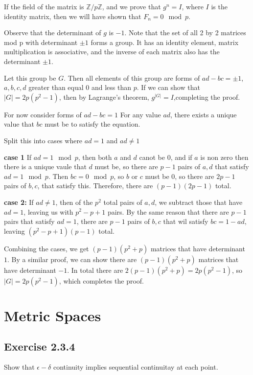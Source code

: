 \documentclass[11pt]{article}
\begin{document}
If the field of the matrix is \(\mathbb{Z} / p \mathbb{Z}\), and we prove
that \(g^n = I\), where \(I\) is the identity matrix, then we will have shown that
\(F_n = 0 \mod p\).


Observe that the determinant of \(g\)  is \(-1\). Note that the set of all 2 by 2 matrices
mod p
with determinant \(\pm 1\) forms a group. It has an identity element,
matrix multiplication is associative, and the inverse of each matrix
also has the determinant \(\pm 1\).

Let this group be \(G\).  Then all elements of this group are forms of \(ad - bc = \pm 1\),
\(a, b, c, d\) greater than equal \(0\) and  less than \(p\). If we can show that
\(|G| = 2p(p^2 - 1)\), then by Lagrange's theorem, \(g^{|G|} = I\),completing the proof.


For now consider forms of \(ad - bc = 1\)
For any value \(ad\), there exists a unique value that \(bc\) must be to
satisfy the equation.

Split this into cases where \(ad = 1\) and \(ad \ne 1\)

\textbf{case 1}
If \(ad = 1 \mod p\), then both \(a\) and \(d\) canot be \(0\), and if \(a\) is non zero
then there is a unique vaule that \(d\) must be, so there are \(p - 1\) pairs of \(a, d\)
that satisfy \(ad = 1 \mod p\).  Then \(bc = 0 \mod p\), so \(b\) or \(c\) must be \(0\), so
there are \(2p - 1\) pairs of \(b, c\), that satisfy this.  Therefore, there are
\((p - 1)(2p - 1)\) total.

\textbf{case 2:}
If \(ad \ne 1\), then of the \(p^2\) total pairs of \(a, d\), we subtract those that have
\(ad = 1\), leaving us with \(p^2 - p + 1\) pairs.  By the same reason that
there are \(p - 1\) pairs that satisfy \(ad = 1\), there are \(p -1\) pairs of \(b, c\)
that wil satisfy \(bc = 1 - ad\), leaving \((p^2 - p + 1)(p - 1)\) total.

Combining the cases, we get \((p - 1)(p^2 + p)\) matrices that have determinant \(1\).
By a similar proof, we can show there are \((p - 1)(p^2 + p)\) matrices that have
determinant \(-1\).  In total there are \(2(p-1)(p^2 + p) = 2p(p^2 - 1)\), so
\(|G| = 2p(p^2 - 1)\), which completes the proof.

\section{Metric Spaces}
\label{sec:orgcea62a3}

\subsection{Exercise 2.3.4}
\label{sec:org1364005}
Show that \(\epsilon -\delta\) continuity implies sequential continuitay at
each point.
\end{document}
